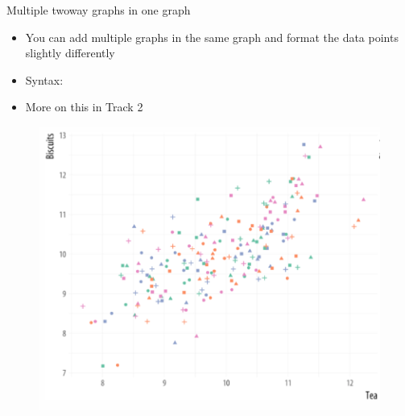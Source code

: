 \documentclass[aspectratio=169]{beamer}
\begin{document}
\begin{frame}[fragile]{ Multiple twoway graphs in one graph}
\begin{multicols}{2}	
	\begin{itemize}
		\item You can add multiple graphs in the same graph and format the data points slightly differently
		\item Syntax: 
		\item More on this in Track 2
	\end{itemize}
	\begin{figure}
		\centering
		\includegraphics[width=\linewidth]{img/twoway2}
	\end{figure}
\end{multicols}
\end{frame}
\end{document}
